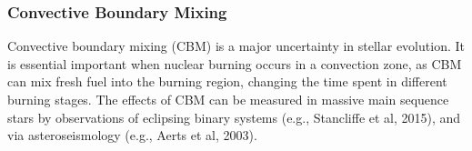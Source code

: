 {\color{purple}
\subsubsection{Convective Boundary Mixing}
}


Convective boundary mixing (CBM) is a major uncertainty in stellar evolution. It is essential important when nuclear burning occurs in a convection zone, as CBM can mix fresh fuel into the burning region, changing the time spent in different burning stages. The effects of CBM can be measured in massive main sequence stars by observations of eclipsing binary systems (e.g., Stancliffe et al, 2015), and via asteroseismology (e.g., Aerts et al, 2003).




